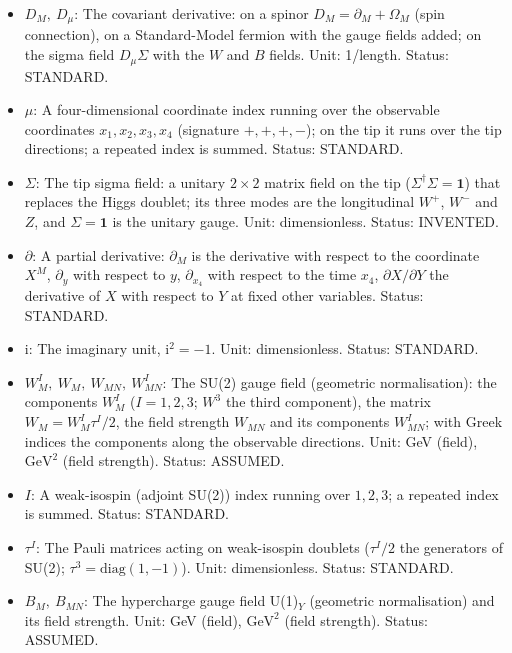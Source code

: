 \documentclass[
  10pt,
]{article}
\providecommand{\tightlist}{%
  \setlength{\itemsep}{0pt}\setlength{\parskip}{0pt}}
\begin{document}
\begin{itemize}
\tightlist
\item
  \(D_M,\ D_\mu\): The covariant derivative: on a spinor
  \(D_M = \partial_M + \Omega_M\) (spin connection), on a Standard-Model
  fermion with the gauge fields added; on the sigma field
  \(D_\mu\Sigma\) with the \(W\) and \(B\) fields. Unit: 1/length.
  Status: STANDARD.
\item
  \(\mu\): A four-dimensional coordinate index running over the
  observable coordinates \(x_1, x_2, x_3, x_4\) (signature \(+,+,+,-\));
  on the tip it runs over the tip directions; a repeated index is
  summed. Status: STANDARD.
\item
  \(\Sigma\): The tip sigma field: a unitary \(2 \times 2\) matrix field
  on the tip (\(\Sigma^\dagger\Sigma = \mathbf{1}\)) that replaces the
  Higgs doublet; its three modes are the longitudinal \(W^+\), \(W^-\)
  and \(Z\), and \(\Sigma = \mathbf{1}\) is the unitary gauge. Unit:
  dimensionless. Status: INVENTED.
\item
  \(\partial\): A partial derivative: \(\partial_M\) is the derivative
  with respect to the coordinate \(X^M\), \(\partial_y\) with respect to
  \(y\), \(\partial_{x_4}\) with respect to the time \(x_4\),
  \(\partial X/\partial Y\) the derivative of \(X\) with respect to
  \(Y\) at fixed other variables. Status: STANDARD.
\item
  \(\mathrm{i}\): The imaginary unit, \(\mathrm{i}^2 = -1\). Unit:
  dimensionless. Status: STANDARD.
\item
  \(W^I_M,\ W_M,\ W_{MN},\ W^I_{MN}\): The SU(2) gauge field (geometric
  normalisation): the components \(W^I_M\) (\(I = 1, 2, 3\); \(W^3\) the
  third component), the matrix \(W_M = W^I_M\tau^I/2\), the field
  strength \(W_{MN}\) and its components \(W^I_{MN}\); with Greek
  indices the components along the observable directions. Unit: GeV
  (field), \(\mathrm{GeV}^{2}\) (field strength). Status: ASSUMED.
\item
  \(I\): A weak-isospin (adjoint SU(2)) index running over \(1, 2, 3\);
  a repeated index is summed. Status: STANDARD.
\item
  \(\tau^I\): The Pauli matrices acting on weak-isospin doublets
  (\(\tau^I/2\) the generators of SU(2);
  \(\tau^3 = \mathrm{diag}(1, -1)\)). Unit: dimensionless. Status:
  STANDARD.
\item
  \(B_M,\ B_{MN}\): The hypercharge gauge field U(1)\(_Y\) (geometric
  normalisation) and its field strength. Unit: GeV (field),
  \(\mathrm{GeV}^{2}\) (field strength). Status: ASSUMED.

\end{itemize}
\end{document}
